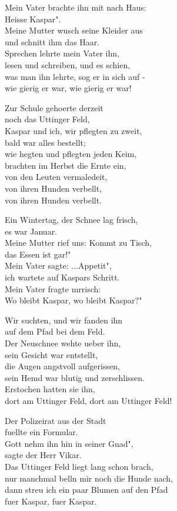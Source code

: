 \documentclass[
  letterpaper,
]{scrbook}
\begin{document}
Mein Vater brachte ihn mit nach Haus:\\
Heisse Kaspar".\\
Meine Mutter wusch seine Kleider aus\\
und schnitt ihm das Haar.\\
Sprechen lehrte mein Vater ihn,\\
lesen und schreiben, und es schien,\\
was man ihn lehrte, sog er in sich auf -\\
wie gierig er war, wie gierig er war!

Zur Schule gehoerte derzeit\\
noch das Uttinger Feld,\\
Kaspar und ich, wir pflegten zu zweit,\\
bald war alles bestellt;\\
wie hegten und pflegten jeden Keim,\\
brachten im Herbst die Ernte ein,\\
von den Leuten vermaledeit,\\
von ihren Hunden verbellt,\\
von ihren Hunden verbellt.

Ein Wintertag, der Schnee lag frisch,\\
es war Januar.\\
Meine Mutter rief uns: Kommt zu Tisch,\\
das Essen ist gar!"\\
Mein Vater sagte: ...Appetit",\\
ich wartete auf Kaspars Schritt.\\
Mein Vater fragte mrrisch:\\
Wo bleibt Kaspar, wo bleibt Kaspar?"

Wir suchten, und wir fanden ihn\\
auf dem Pfad bei dem Feld.\\
Der Neuschnee wehte ueber ihn,\\
sein Gesicht war entstellt,\\
die Augen angstvoll aufgerissen,\\
sein Hemd war blutig und zerschlissen.\\
Erstochen hatten sie ihn,\\
dort am Uttinger Feld, dort am Uttinger Feld!

Der Polizeirat aus der Stadt\\
fuellte ein Formular.\\
Gott nehm\textquotesingle{} ihn hin in seiner Gnad"\textquotesingle,\\
sagte der Herr Vikar.\\
Das Uttinger Feld liegt lang schon brach,\\
nur manchmal bell\textquotesingle n mir noch die Hunde nach,\\
dann streu\textquotesingle{} ich ein paar Blumen auf den Pfad\\
fuer Kaspar, fuer Kaspar.
\end{document}
